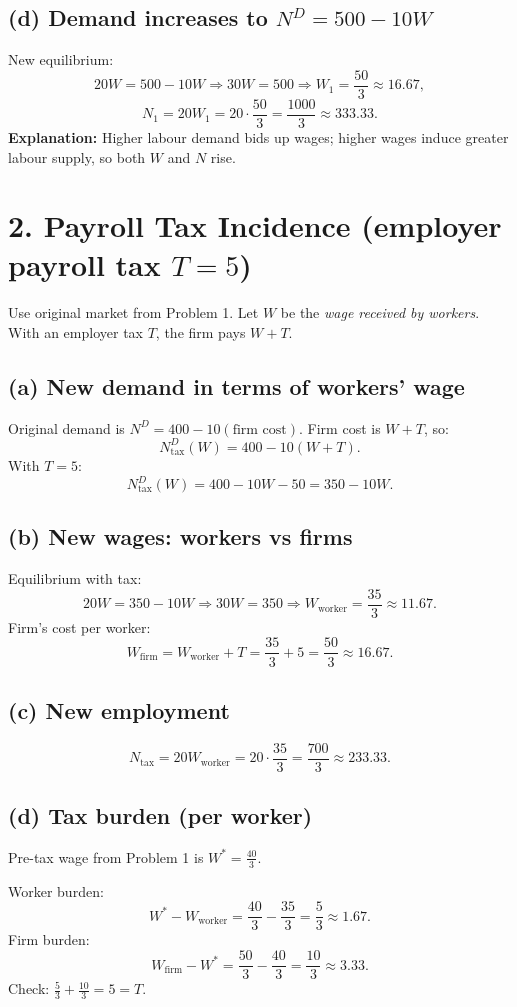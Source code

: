 \documentclass[12pt]{article}
\begin{document}
\subsection*{(d) Demand increases to $N^D=500-10W$}
New equilibrium:
\[
20W = 500 - 10W \Rightarrow 30W=500 \Rightarrow W_1=\frac{50}{3}\approx 16.67,
\]
\[
N_1 = 20W_1 = 20\cdot \frac{50}{3}=\frac{1000}{3}\approx 333.33.
\]
\textbf{Explanation:} Higher labour demand bids up wages; higher wages induce greater labour supply, so both $W$ and $N$ rise.



\section*{2. Payroll Tax Incidence (employer payroll tax $T=5$)}

Use original market from Problem 1. Let $W$ be the \emph{wage received by workers}. With an employer tax $T$, the firm pays $W+T$.

\subsection*{(a) New demand in terms of workers' wage}
Original demand is $N^D=400-10(\text{firm cost})$. Firm cost is $W+T$, so:
\[
N^D_{\text{tax}}(W)=400-10(W+T).
\]
With $T=5$:
\[
N^D_{\text{tax}}(W)=400-10W-50=350-10W.
\]

\subsection*{(b) New wages: workers vs firms}
Equilibrium with tax:
\[
20W = 350 - 10W \Rightarrow 30W=350 \Rightarrow W_{\text{worker}}=\frac{35}{3}\approx 11.67.
\]
Firm's cost per worker:
\[
W_{\text{firm}}=W_{\text{worker}}+T=\frac{35}{3}+5=\frac{50}{3}\approx 16.67.
\]

\subsection*{(c) New employment}
\[
N_{\text{tax}}=20W_{\text{worker}}=20\cdot\frac{35}{3}=\frac{700}{3}\approx 233.33.
\]

\subsection*{(d) Tax burden (per worker)}
Pre-tax wage from Problem 1 is $W^*=\frac{40}{3}$.

Worker burden:
\[
W^* - W_{\text{worker}} = \frac{40}{3}-\frac{35}{3}=\frac{5}{3}\approx 1.67.
\]
Firm burden:
\[
W_{\text{firm}}-W^*=\frac{50}{3}-\frac{40}{3}=\frac{10}{3}\approx 3.33.
\]
Check: $\frac{5}{3}+\frac{10}{3}=5=T$.
\end{document}
